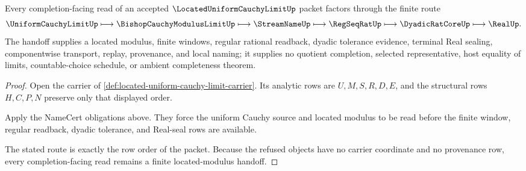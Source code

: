 \begin{theorem}
\label{thm:located-uniform-cauchy-limit-completion-handoff}
Every completion-facing read of an accepted $\LocatedUniformCauchyLimitUp$ packet factors through the finite route
$$
\UniformCauchyLimitUp
\longmapsto
\BishopCauchyModulusLimitUp
\longmapsto
\StreamNameUp
\longmapsto
\RegSeqRatUp
\longmapsto
\DyadicRatCoreUp
\longmapsto
\RealUp .
$$
The handoff supplies a located modulus, finite windows, regular rational readback, dyadic tolerance evidence, terminal Real sealing, componentwise transport, replay, provenance, and local naming; it supplies no quotient completion, selected representative, host equality of limits, countable-choice schedule, or ambient completeness theorem.
\end{theorem}
\begin{proof}
Open the carrier of \autoref{def:located-uniform-cauchy-limit-carrier}. Its analytic rows are $U,M,S,R,D,E$, and the structural rows $H,C,P,N$ preserve only that displayed order.

Apply the NameCert obligations above. They force the uniform Cauchy source and located modulus to be read before the finite window, regular readback, dyadic tolerance, and Real-seal rows are available.

The stated route is exactly the row order of the packet. Because the refused objects have no carrier coordinate and no provenance row, every completion-facing read remains a finite located-modulus handoff.
\end{proof}

\begin{closurestatus}{\LocatedUniformCauchyLimitUp}
  \theoryclosure{\seedClosure}
  \formalstatus{\unformalizedV}
\end{closurestatus}
